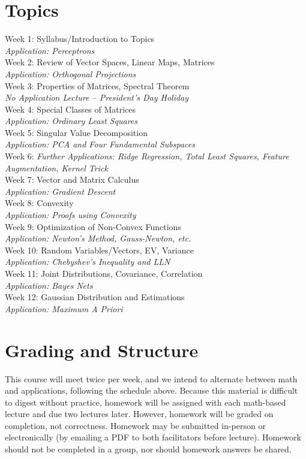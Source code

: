 \documentclass{article}
\begin{document}
\section{Topics}
\begin{multicols}{2}
\noindent
Week 1: Syllabus/Introduction to Topics \\
\textit{Application: Perceptrons} \\
Week 2: Review of Vector Spaces, Linear Maps, Matrices \\
\textit{Application: Orthogonal Projections} \\
Week 3: Properties of Matrices, Spectral Theorem \\
\textit{No Application Lecture -- President's Day Holiday}\\
Week 4: Special Classes of Matrices \\
\textit{Application: Ordinary Least Squares} \\
Week 5: Singular Value Decomposition\\
\textit{Application: PCA and Four Fundamental Subspaces} \\
Week 6: \textit{Further Applications: Ridge Regression, Total Least Squares, Feature Augmentation, Kernel Trick} \\
Week 7: Vector and Matrix Calculus \\
\textit{Application: Gradient Descent}\\
Week 8: Convexity \\
\textit{Application: Proofs using Convexity} \\
Week 9: Optimization of Non-Convex Functions \\
\textit{Application: Newton's Method, Gauss-Newton, etc.} \\
Week 10: Random Variables/Vectors, EV, Variance \\
\textit{Application: Chebyshev's Inequality and LLN} \\
Week 11: Joint Distributions, Covariance, Correlation \\
\textit{Application: Bayes Nets} \\ 
Week 12: Gaussian Distribution and Estimations \\
\textit{Application: Maximum A Priori}
\end{multicols}

\section{Grading and Structure}
This course will meet twice per week, and we intend to alternate between math and applications, following the schedule above. Because this material is difficult to digest without practice, homework will be assigned with each math-based lecture and due two lectures later. However, homework will be graded on completion, not correctness. Homework may be submitted in-person or electronically (by emailing a PDF to both facilitators before lecture). Homework should not be completed in a group, nor should homework answers be shared. \\
\end{document}
